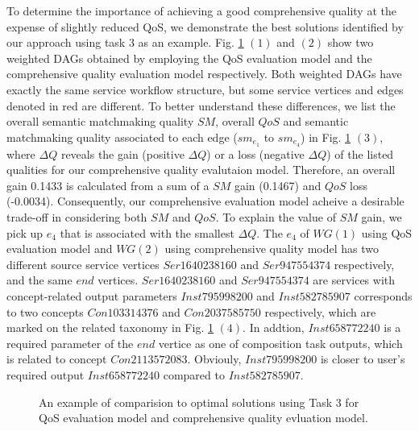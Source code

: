 \documentclass{llncs}
\begin{document}
To determine the importance of achieving a good comprehensive quality at the expense of slightly reduced QoS, we demonstrate the best solutions identified by our approach using task 3 as an example. Fig. \ref{comparisontest} $(1)$ and $(2)$ show two weighted DAGs obtained by employing the QoS evaluation model and the comprehensive quality evaluation model respectively. Both weighted DAGs have exactly the same service workflow structure, but some service vertices and edges denoted in red are different. To better understand these differences, we list the overall semantic matchmaking quality $SM$,  overall $QoS$ and semantic matchmaking quality associated to each edge ($sm_{e_1}$ to $sm_{e_4}$) in Fig. \ref{comparisontest} $(3)$, where $\Delta Q$ reveals the gain (positive $\Delta Q$) or a loss (negative $\Delta Q$) of the listed qualities for our comprehensive quality evalutaion model. Therefore, an overall gain 0.1433 is calculated from a sum of a $SM$ gain (0.1467) and $QoS$ loss (-0.0034). Consequently, our comprehensive evaluation model acheive a desirable trade-off in considering both $SM$ and $QoS$. To explain the value of $SM$ gain, we pick up $e_4$ that is associated with the smallest $\Delta Q$. The $e_4$ of $WG(1)$ using QoS evaluation model and $WG(2)$ using comprehensive quality model has two different source service vertices $Ser1640238160$ and $Ser947554374$ respectively,  and the same $end$ vertices. $Ser1640238160$ and $Ser947554374$ are services with concept-related output parameters $Inst795998200$ and $Inst582785907$ corresponds to two concepts $Con103314376$ and $Con2037585750$ respectively, which are marked on the related taxonomy in Fig. \ref{comparisontest} $(4)$. In addtion, $Inst658772240$ is a required parameter of the $end$ vertice as one of composition task outputs, which is related to concept $Con2113572083$. Obviouly,  $Inst795998200$ is closer to user's required output $Inst658772240$ compared to $Inst582785907$.

\begin{figure}[h]
 \caption{An example of comparision to optimal solutions using Task 3 for QoS evaluation model and comprehensive quality evluation model.}
 \label{comparisontest}
\end{figure}
\end{document}
